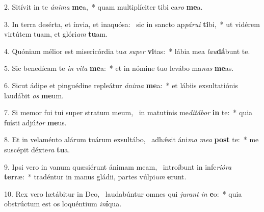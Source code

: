 2. Sitívit in te \textit{á}\textit{ni}\textit{ma} \textbf{me}a,~*  quam multiplíciter tibi ca\textit{ro} \textbf{me}a.\

3. In terra desérta, et ínvia, et inaquósa: \dag\  sic in sancto ap\textit{pá}\textit{ru}\textit{i} \textbf{ti}bi,~*  ut vidérem virtútem tuam, et glóri\textit{am} \textbf{tu}am.\

4. Quóniam mélior est misericórdia tu\textit{a} \textit{su}\textit{per} \textbf{vi}tas:~*  lábia mea \textit{lau}\textbf{dá}bunt te.\

5. Sic benedícam te \textit{in} \textit{vi}\textit{ta} \textbf{me}a:~*  et in nómine tuo levábo ma\textit{nus} \textbf{me}as.\

6. Sicut ádipe et pinguédine repleátur \textit{á}\textit{ni}\textit{ma} \textbf{me}a:~*  et lábiis exsultatiónis laudábit \textit{os} \textbf{me}um.\

7. Si memor fui tui super stratum meum, \dag\  in matutínis me\textit{di}\textit{tá}\textit{bor} \textbf{in} te:~*  quia fuísti adjú\textit{tor} \textbf{me}us.\

8. Et in velaménto alárum tuárum exsultábo, \dag\  adhǽsit áni\textit{ma} \textit{me}\textit{a} \textbf{post} te:~*  me suscépit déxte\textit{ra} \textbf{tu}a.\

9. Ipsi vero in vanum quæsiérunt ánimam meam, \dag\  introíbunt in infe\textit{ri}\textit{ó}\textit{ra} \textbf{ter}ræ:~*  tradéntur in manus gládii, partes vúlpi\textit{um} \textbf{e}runt.\

10. Rex vero lætábitur in Deo, \dag\  laudabúntur omnes qui \textit{ju}\textit{rant} \textit{in} \textbf{e}o:~*  quia obstrúctum est os loquéntium \textit{in}\textbf{í}qua.\

